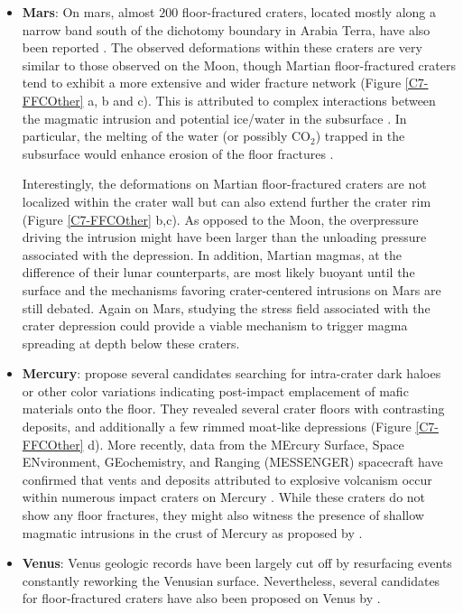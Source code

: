 \begin{itemize}
\item \textbf{Mars}:  On mars,  almost $200$  floor-fractured craters,
  located mostly along  a narrow band south of  the dichotomy boundary
  in Arabia Terra, have also been reported \citep{Bamberg:2014hb}. The
  observed deformations within these craters are very similar to those
  observed on the Moon, though Martian floor-fractured craters tend to
  exhibit  a  more  extensive   and  wider  fracture  network  (Figure
  \ref{C7-FFCOther}  a,  b  and  c). This  is  attributed  to  complex
  interactions between the magmatic  intrusion and potential ice/water
  in the subsurface \citep{Sato:2010ex,Bamberg:2014hb}. In particular,
  the  melting  of the  water  (or  possibly  CO$_2$) trapped  in  the
  subsurface   would   enhance   erosion  of   the   floor   fractures
  \citep{Sato:2010ex}.

  Interestingly, the  deformations on Martian  floor-fractured craters
  are not localized within the crater wall but can also extend further
  the crater  rim (Figure \ref{C7-FFCOther}  b,c).  As opposed  to the
  Moon, the overpressure driving the  intrusion might have been larger
  than  the unloading  pressure  associated with  the depression.   In
  addition,  Martian   magmas,  at  the  difference   of  their  lunar
  counterparts,  are most  likely buoyant  until the  surface and  the
  mechanisms  favoring crater-centered  intrusions on  Mars are  still
  debated. Again  on Mars, studying  the stress field  associated with
  the crater  depression could provide  a viable mechanism  to trigger
  magma spreading at depth below these craters.

\item   \textbf{Mercury}:    \citet{Schultz:1977ec}   propose   several
  candidates  searching for  intra-crater dark  haloes or  other color
  variations  indicating post-impact  emplacement  of mafic  materials
  onto the floor. They revealed several crater floors with contrasting
  deposits,  and  additionally  a  few  rimmed  moat-like  depressions
  (Figure \ref{C7-FFCOther}  d). More recently, data  from the MErcury
  Surface,  Space ENvironment,  GEochemistry, and  Ranging (MESSENGER)
  spacecraft  have confirmed  that  vents and  deposits attributed  to
  explosive volcanism occur within  numerous impact craters on Mercury
  \citep{GillisDavis:2009cd,Head:2009ia,Kerber:2009dz}.   While  these
  craters do not show any floor fractures, they might also witness the
  presence of shallow  magmatic intrusions in the crust  of Mercury as
  proposed by \citet{Thomas:2015tt}.

\item \textbf{Venus}: Venus geologic records have been largely cut off
  by  resurfacing events  constantly reworking  the Venusian  surface.
  Nevertheless,  several candidates  for floor-fractured  craters have
  also been proposed on Venus by \citet{Wichman:1995ju}.
\end{itemize}

\cleardoublepage

